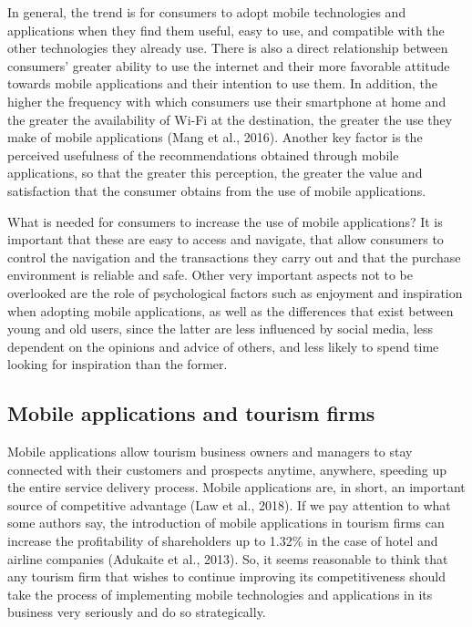 \documentclass[
  letterpaper,
  DIV=11,
  numbers=noendperiod]{scrreprt}
\begin{document}
In general, the trend is for consumers to adopt mobile technologies and
applications when they find them useful, easy to use, and compatible
with the other technologies they already use. There is also a direct
relationship between consumers' greater ability to use the internet and
their more favorable attitude towards mobile applications and their
intention to use them. In addition, the higher the frequency with which
consumers use their smartphone at home and the greater the availability
of Wi-Fi at the destination, the greater the use they make of mobile
applications (Mang et al., 2016). Another key factor is the perceived
usefulness of the recommendations obtained through mobile applications,
so that the greater this perception, the greater the value and
satisfaction that the consumer obtains from the use of mobile
applications.

What is needed for consumers to increase the use of mobile applications?
It is important that these are easy to access and navigate, that allow
consumers to control the navigation and the transactions they carry out
and that the purchase environment is reliable and safe. Other very
important aspects not to be overlooked are the role of psychological
factors such as enjoyment and inspiration when adopting mobile
applications, as well as the differences that exist between young and
old users, since the latter are less influenced by social media, less
dependent on the opinions and advice of others, and less likely to spend
time looking for inspiration than the former.

\hypertarget{mobile-applications-and-tourism-firms}{%
\subsection{Mobile applications and tourism
firms}\label{mobile-applications-and-tourism-firms}}

Mobile applications allow tourism business owners and managers to stay
connected with their customers and prospects anytime, anywhere, speeding
up the entire service delivery process. Mobile applications are, in
short, an important source of competitive advantage (Law et al., 2018).
If we pay attention to what some authors say, the introduction of mobile
applications in tourism firms can increase the profitability of
shareholders up to 1.32\% in the case of hotel and airline companies
(Adukaite et al., 2013). So, it seems reasonable to think that any
tourism firm that wishes to continue improving its competitiveness
should take the process of implementing mobile technologies and
applications in its business very seriously and do so strategically.
\end{document}
